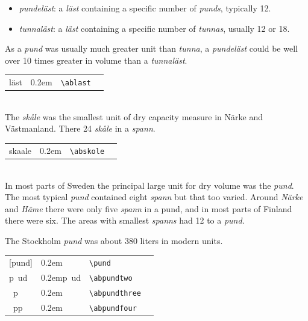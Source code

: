 \documentclass[a4paper]{article}
\newcommand{\samplefont}{\fontsize{16}{16}\abcursivefamily\spaceskip0.2em}
\newcommand{\sample}[1]{{\samplefont #1 \strut}}
\newcommand{\ltxncmd}[1]{\texttt{\textbackslash{}#1}}
\begin{document}
\begin{description}
  \begin{itemize}
  \item \emph{pundeläst}: a \emph{läst} containing a specific number
    of \emph{punds}, typically 12.
  \item \emph{tunnaläst}: a \emph{läst} containing a specific number
    of \emph{tunnas}, usually 12 or 18. 
  \end{itemize}

  As a \emph{pund} was usually much greater unit than \emph{tunna}, a
  \emph{pundeläst} could be well over 10 times greater in volume than
  a \emph{tunnaläst}.

  \begin{center}
    \begin{tabular}{llll}
      {}läst  & \sample{\abkolmannes} & \ltxncmd{ablast} \\
    \end{tabular}
  \end{center}


\item [\sample{\abskole} \emph{skåle}] \mbox{} \\
  The \emph{skåle} was the smallest unit of dry capacity measure in Närke
  and Västmanland. There 24 \emph{skåle} in a \emph{spann}. 
  \begin{center}
    \begin{tabular}{llll}
      {}skaale  & \sample{\abskole} & \ltxncmd{abskole} \\
    \end{tabular}
  \end{center}

\item [\sample{\abpund}, \sample{\abpundthree}
  \emph{pund}, \emph{punta}] \mbox{} \\
  In most parts of Sweden the principal large unit for dry volume was
  the \emph{pund}. The most typical \emph{pund} contained eight
  \emph{spann} but that too varied. Around \emph{Närke} and
  \emph{Häme} there were only five \emph{spann} in a pund, and in most
  parts of Finland there were six. The areas with smallest
  \emph{spanns} had 12 to a \emph{pund}. 

  The Stockholm \emph{pund} was about 380 liters in modern units. 
  \begin{center}
    \begin{tabular}{llll}
      {}[pund]  & \sample{\abpund} & \ltxncmd{pund} \\
      {}p~ud  & \sample{p~ud} & \ltxncmd{abpundtwo} \\
      {}~p & \sample{\abpundthree} & \ltxncmd{abpundthree} \\
      {}~pp & \sample{\abpundfour} & \ltxncmd{abpundfour} \\
    \end{tabular}
  \end{center}



\end{description}
\end{document}
